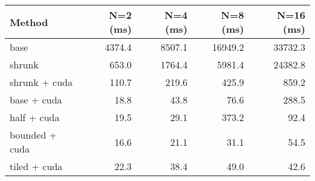 \begin{tabular}{lrrrr}
\hline
 Method         &   N=2 (ms) &   N=4 (ms) &   N=8 (ms) &   N=16 (ms) \\
\hline
 base           &     4374.4 &     8507.1 &    16949.2 &     33732.3 \\
 shrunk         &      653.0 &     1764.4 &     5981.4 &     24382.8 \\
 shrunk + cuda  &      110.7 &      219.6 &      425.9 &       859.2 \\
 base + cuda    &       18.8 &       43.8 &       76.6 &       288.5 \\
 half + cuda    &       19.5 &       29.1 &      373.2 &        92.4 \\
 bounded + cuda &       16.6 &       21.1 &       31.1 &        54.5 \\
 tiled + cuda   &       22.3 &       38.4 &       49.0 &        42.6 \\
\hline
\end{tabular}
